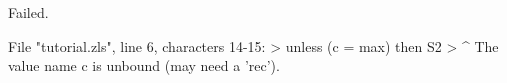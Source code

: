 \chklistingfalse
{}
\begin{ChkListingMsg}
Failed.
\end{ChkListingMsg}
\begin{ChkListingErr}
File "tutorial.zls", line 6, characters 14-15:
>      unless (c = max) then S2
>              ^
The value name c is unbound (may need a 'rec').
\end{ChkListingErr}
